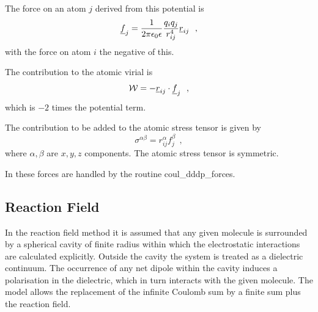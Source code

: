 The force on an atom $j$ derived from this potential is
\begin{equation}
\mbox{$\underline{f}$}_{j} = \frac{1}{2\pi\epsilon_{0}\epsilon} \frac{q_{i}q_{j}}{r_{ij}^{4}} \mbox{$\underline{r}$}_{ij}~~,
\end{equation}
with the force on atom $i$ the negative of this.

The contribution to the atomic virial is
\begin{equation}
{\cal W} = -\mbox{$\underline{r}$}_{ij} \cdot \mbox{$\underline{f}$}_{j}~~,
\end{equation}
which is $-2$ times the potential term.

The contribution to be added to the atomic stress
tensor is given by
\begin{equation}
\sigma^{\alpha \beta} = r_{ij}^{\alpha} f_{j}^{\beta}~~,
\end{equation}
where $\alpha,\beta$ are $x,y,z$ components.  The atomic stress
tensor is symmetric.

In \D these forces are handled by the routine {\sc
coul\_dddp\_forces}.

\subsection{Reaction Field}

In the reaction field method it is assumed
that any given molecule is surrounded by a spherical cavity of
finite radius within which the electrostatic interactions are
calculated explicitly.  Outside the cavity the system is treated
as a dielectric continuum.
The occurrence of any net dipole within the cavity induces a
polarisation in the dielectric, which in turn interacts with the
given molecule.  The model allows the replacement of the infinite
Coulomb sum by a finite sum plus the reaction field.

